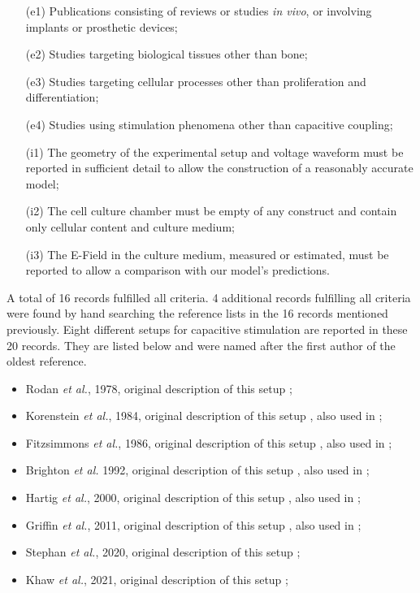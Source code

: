 \begin{itemize}
\footnotesize
\item[(e1)] Publications consisting of reviews or studies \textit{in vivo}, or involving implants or prosthetic devices;
\item[(e2)] Studies targeting biological tissues other than bone;
\item[(e3)] Studies targeting cellular processes other than proliferation and differentiation;
\item[(e4)] Studies using stimulation phenomena other than capacitive coupling;
\item[(i1)] The geometry of the experimental setup and voltage waveform must be reported in sufficient detail to allow the construction of a reasonably accurate model; 
\item[(i2)] The cell culture chamber must be empty of any construct and contain only cellular content and culture medium;
\item[(i3)] The E-Field in the culture medium, measured or estimated, must be reported to allow a comparison with our model's predictions.
\end{itemize}

A total of 16 records fulfilled all criteria. 4 additional records fulfilling all criteria were found by hand searching the reference lists in the 16 records mentioned previously. Eight different setups for capacitive stimulation are reported in these 20 records. They are listed below and were named after the first author of the oldest reference.

\begin{itemize}
\footnotesize
\item  Rodan \textit{et al.}, 1978, original description of this setup \cite{Rodan1978-yu};
\item  Korenstein \textit{et al.}, 1984, original description of this setup \cite{Korenstein1984-qb}, also used in \cite{Laub1984-qm, Danon1984-eu, Binderman1985-mh, Ozawa1989-uz};
\item  Fitzsimmons \textit{et al.}, 1986, original description of this setup \cite{Fitzsimmons1986-ks}, also used in \cite{Fitzsimmons1989-zj, Fitzsimmons1992-vw}; 
\item  Brighton \textit{et al.} 1992, original description of this setup \cite{Brighton1992-gg}, also used in \cite{Armstrong1988-ob, Wang2006-hx, Brighton2008-rl, Clark2014-sz};
\item  Hartig \textit{et al.}, 2000, original description of this setup \cite{Hartig2000-ny}, also used in \cite{Wiesmann2001-uh};
\item  Griffin \textit{et al.}, 2011, original description of this setup \cite{Griffin2011-bb}, also used in \cite{Griffin2013-wp};
\item  Stephan \textit{et al.}, 2020, original description of this setup \cite{Stephan2020-qh};
\item  Khaw \textit{et al.}, 2021, original description of this setup \cite{Khaw2021-tv};
\end{itemize}

